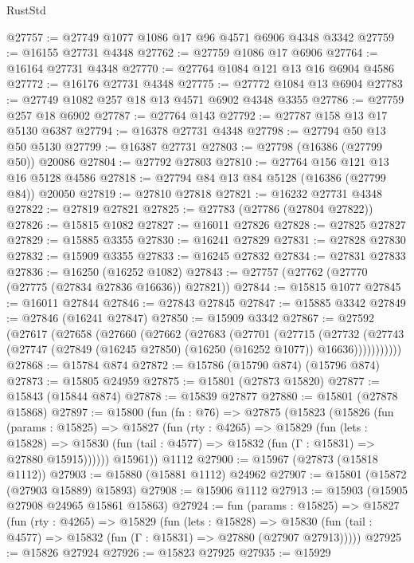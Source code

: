 \begin{lexlean}{RustStd}
\begin{coremodule}
@27757 := @27749 @1077 @1086 @17 @96 @4571 @6906 @4348 @3342
@27759 := @16155 @27731 @4348
@27762 := @27759 @1086 @17 @6906
@27764 := @16164 @27731 @4348
@27770 := @27764 @1084 @121 @13 @16 @6904 @4586
@27772 := @16176 @27731 @4348
@27775 := @27772 @1084 @13 @6904
@27783 := @27749 @1082 @257 @18 @13 @4571 @6902 @4348 @3355
@27786 := @27759 @257 @18 @6902
@27787 := @27764 @143
@27792 := @27787 @158 @13 @17 @5130 @6387
@27794 := @16378 @27731 @4348
@27798 := @27794 @50 @13 @50 @5130
@27799 := @16387 @27731
@27803 := @27798 (@16386 (@27799 @50)) @20086
@27804 := @27792 @27803
@27810 := @27764 @156 @121 @13 @16 @5128 @4586
@27818 := @27794 @84 @13 @84 @5128 (@16386 (@27799 @84)) @20050
@27819 := @27810 @27818
@27821 := @16232 @27731 @4348
@27822 := @27819 @27821
@27825 := @27783 (@27786 (@27804 @27822))
@27826 := @15815 @1082
@27827 := @16011 @27826
@27828 := @27825 @27827
@27829 := @15885 @3355
@27830 := @16241 @27829
@27831 := @27828 @27830
@27832 := @15909 @3355
@27833 := @16245 @27832
@27834 := @27831 @27833
@27836 := @16250 (@16252 @1082)
@27843 := @27757 (@27762 (@27770 (@27775 (@27834 @27836 @16636)) @27821))
@27844 := @15815 @1077
@27845 := @16011 @27844
@27846 := @27843 @27845
@27847 := @15885 @3342
@27849 := @27846 (@16241 @27847)
@27850 := @15909 @3342
@27867 := @27592
    (@27617
      (@27658
        (@27660
          (@27662
            (@27683
              (@27701
                (@27715
                  (@27732
                    (@27743
                      (@27747 (@27849 (@16245 @27850) (@16250 (@16252 @1077)) @16636)))))))))))
@27868 := @15784 @874
@27872 := @15786 (@15790 @874) (@15796 @874)
@27873 := @15805 @24959
@27875 := @15801 (@27873 @15820)
@27877 := @15843 (@15844 @874)
@27878 := @15839 @27877
@27880 := @15801 (@27878 @15868)
@27897 := @15800
    (fun (fn : @76) =>
    @27875
      (@15823
        (@15826
          (fun (params : @15825) =>
          @15827
            (fun (rty : @4265) =>
            @15829
              (fun (lets : @15828) =>
              @15830 (fun (tail : @4577) => @15832 (fun (Γ : @15831) => @27880 @15915))))))
        @15961))
    @1112
@27900 := @15967 (@27873 (@15818 @1112))
@27903 := @15880 (@15881 @1112) @24962
@27907 := @15801 (@15872 (@27903 @15889) @15893)
@27908 := @15906 @1112
@27913 := @15903 (@15905 @27908 @24965 @15861 @15863)
@27924 := fun (params : @15825) =>
  @15827
    (fun (rty : @4265) =>
    @15829
      (fun (lets : @15828) =>
      @15830 (fun (tail : @4577) => @15832 (fun (Γ : @15831) => @27880 (@27907 @27913)))))
@27925 := @15826 @27924
@27926 := @15823 @27925
@27935 := @15929

\end{coremodule}
\end{lexlean}
